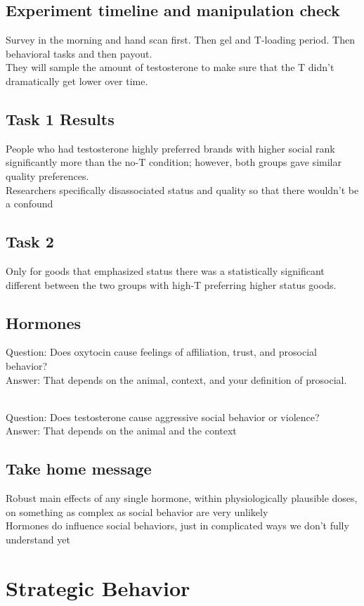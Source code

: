 \subsection{Experiment timeline and manipulation check}
Survey in the morning and hand scan first. Then gel and T-loading period. Then behavioral tasks and then payout.
\\They will sample the amount of testosterone to make sure that the T didn't dramatically get lower over time.
\subsection{Task 1 Results}
People who had testosterone highly preferred brands with higher social rank significantly more than the no-T condition; however, both groups gave similar quality preferences.
\\Researchers specifically disassociated status and quality so that there wouldn't be a confound

\subsection{Task 2}
Only for goods that emphasized status there was a statistically significant different between the two groups with high-T preferring higher status goods.

\subsection{Hormones}
Question: Does oxytocin cause feelings of affiliation, trust, and prosocial behavior?
\\Answer: That depends on the animal, context, and your definition of prosocial.

\\Question: Does testosterone cause aggressive social behavior or violence?
\\Answer: That depends on the animal and the context

\subsection{Take home message}
Robust main effects of any single hormone, within physiologically plausible doses, on something as complex as social behavior are very unlikely
\\Hormones do influence social behaviors, just in complicated ways we don't fully understand yet

\section{Strategic Behavior}
